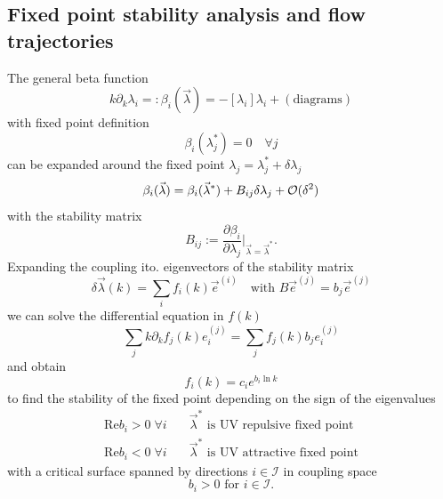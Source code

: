 \subsection{Fixed point stability analysis and flow trajectories}
The general beta function
\begin{equation}
	k\partial_k \lambda_i =: \beta_i (\vec{\lambda}) = - [\lambda_i] \lambda_i + (\text{diagrams})
\end{equation}
with fixed point definition
\begin{equation}
	\beta_i(\lambda^*_j) = 0 \quad \forall j
\end{equation}
can be expanded around the fixed point $\lambda_j=\lambda^*_j+\delta \lambda_j$
\begin{equation}
	\beta_i(\vec{\lambda}) = \beta_i(\vec{\lambda}^*)+B_{ij} \delta \lambda_j + \mathcal{O}(\delta^2)
\end{equation}
with the stability matrix
\begin{equation}
	B_{ij} := \frac{\partial \beta_i}{\partial \lambda_j} |_{\vec{\lambda}=\vec{\lambda}^*}.
\end{equation}
Expanding the coupling ito. eigenvectors of the stability matrix
\begin{equation}
	\delta \vec{\lambda}(k) = \sum_i f_i(k) \vec{e}^{(i)} \quad \text{with } B\vec{e}^{(j)} =b_j \vec{e}^{(j)}
\end{equation}
we can solve the differential equation in $f(k)$
\begin{equation}
	\sum_j k \partial_k f_j(k) e^{(j)}_i = \sum_j f_j(k)b_j e^{(j)}_i
\end{equation}
and obtain
\begin{equation}
	f_i(k)=c_i e^{b_i \ln k}
\end{equation}
to find the stability of the fixed point depending on the sign of the eigenvalues
\begin{align}
	\mathrm{Re}b_i>0 \; \forall i& \quad \vec{\lambda}^* \text{ is UV repulsive fixed point}\\
	\mathrm{Re}b_i<0 \;\forall i&\quad \vec{\lambda}^* \text{ is UV attractive fixed point}
\end{align}
with a critical surface spanned by directions $i\in \mathcal{I}$ in coupling space
\begin{equation}
	b_i >0 \text{ for } i\in \mathcal{I}.
\end{equation}
